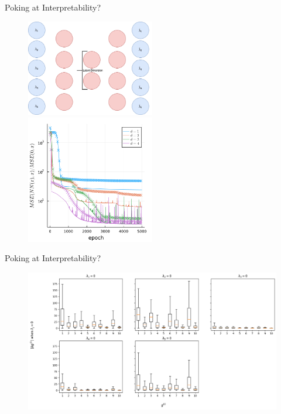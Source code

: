 \begin{frame}{Poking at Interpretability?}
  \begin{figure}
    \centering
    \includegraphics[width=0.5\textwidth]{aeStructure.png}%
    \includegraphics[width=0.5\textwidth]{aeInvariants.png}
  \end{figure}
\end{frame}

\begin{frame}{Poking at Interpretability?}
  \begin{figure}
    \centering
    \includegraphics[width=\textwidth]{dg.png}
  \end{figure}
\end{frame}

